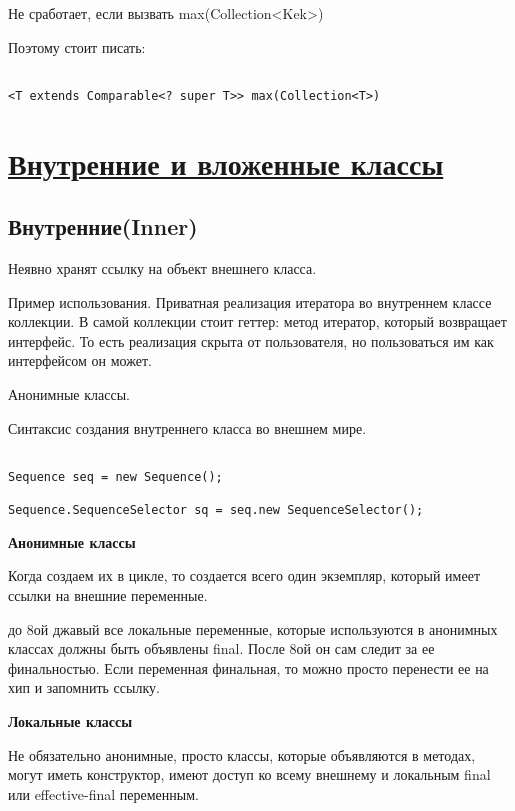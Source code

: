 \documentclass{article}
\begin{document}
Не сработает, если вызвать max(Collection<Kek>)

Поэтому стоит писать:

\begin{lstlisting} 

<T extends Comparable<? super T>> max(Collection<T>)

\end{lstlisting}


\section{\underline{Внутренние и вложенные классы}}

\subsection{Внутренние(Inner)}

Неявно хранят ссылку на объект внешнего класса.

Пример использования. Приватная реализация итератора во внутреннем классе коллекции. В самой коллекции стоит геттер: метод итератор, который возвращает интерфейс. То есть реализация скрыта от пользователя, но пользоваться им как интерфейсом он может.

Анонимные классы. 

Синтаксис создания внутреннего класса во внешнем мире.

\begin{lstlisting}

Sequence seq = new Sequence();

Sequence.SequenceSelector sq = seq.new SequenceSelector();

\end{lstlisting}


\textbf{Анонимные классы}

Когда создаем их в цикле, то создается всего один экземпляр, который имеет ссылки на внешние переменные.

до 8ой джавый все локальные переменные, которые используются в анонимных классах должны быть объявлены final. После 8ой он сам следит за ее финальностью. Если переменная финальная, то можно просто перенести ее на хип и запомнить ссылку. 

\textbf{Локальные классы}

Не обязательно анонимные, просто классы, которые объявляются в методах, могут иметь конструктор, имеют доступ ко всему внешнему и локальным final или effective-final переменным.
\end{document}
